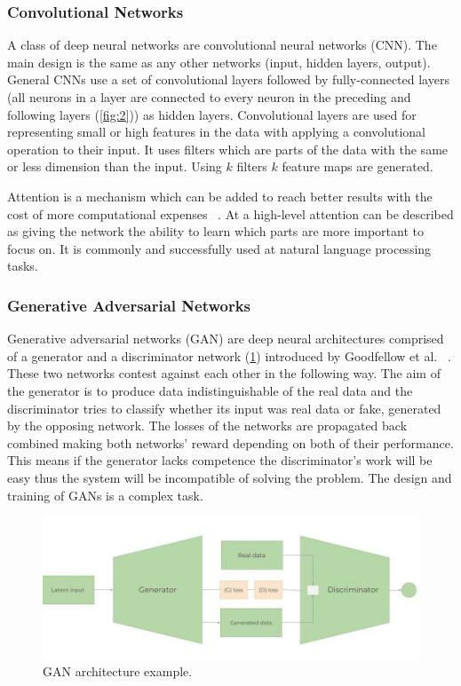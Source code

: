 \documentclass[11pt,a4paper,oneside]{article}
\begin{document}
  \subsubsection{Convolutional Networks}
  \label{sec:conv_nets}

  A class of deep neural networks are convolutional neural networks (CNN). The main design is the same as any other 
  networks (input, hidden layers, output). General CNNs use a set of convolutional layers followed by fully-connected 
  layers (all neurons in a layer are connected to every neuron in the preceding and following layers (\ref{fig:2})) as 
  hidden layers. Convolutional layers are used for representing small or high features in the data with applying a 
  convolutional operation to their input. It uses filters which are parts of the data with the same or less dimension 
  than the input. Using $k$ filters $k$ feature maps are generated.
  
  Attention is a mechanism which can be added to reach better results with the cost of more computational expenses 
  ~\cite{attention}. At a high-level attention can be described as giving the network the ability to learn which parts 
  are more important to focus on. It is commonly and successfully used at natural language processing tasks.

  \subsubsection{Generative Adversarial Networks}
  \label{sec:gans}

  Generative adversarial networks (GAN) are deep neural architectures comprised of a generator and a discriminator 
  network (\ref{fig:3}) introduced by Goodfellow et al. ~\cite{gan}. These two networks contest against each other in 
  the following way. The aim of the generator is to produce data indistinguishable of the real data and the 
  discriminator tries to classify whether its input was real data or fake, generated by the opposing network. The losses 
  of the networks are propagated back combined making both networks’ reward depending on both of their performance. This 
  means if the generator lacks competence the discriminator’s work will be easy thus the system will be incompatible of 
  solving the problem. The design and training of GANs is a complex task.

  \begin{figure}[tbh]
    \centering
    \includegraphics[width=12cm]{gan.jpg}
    \caption{GAN architecture example.}
    \label{fig:3}
  \end{figure}
\end{document}
